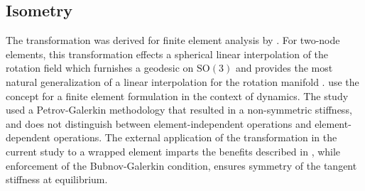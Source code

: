 
\subsection{\texorpdfstring{\Spherical}{Spherical} Isometry}\label{sec:sfin}

The \Spherical{} transformation 
was derived for finite element analysis %
by \cite{crisfield1999objectivity}.
For two-node elements, this transformation effects a 
spherical linear interpolation of the rotation field
which furnishes
 a geodesic on \(\mathrm{SO}(3)\) 
and provides the most natural generalization of 
a %
linear interpolation for the rotation manifold \citep{shoemake1985animating}.
%
\cite{jelenić1999geometrically} use the concept 
for a finite element formulation in the context of dynamics.
The study used a Petrov-Galerkin methodology that resulted
in a non-symmetric stiffness,
 and does not distinguish between element-independent operations and element-dependent operations.
The external application of the transformation in the current study to a wrapped element
imparts %
the benefits described in \cite{crisfield1999objectivity},
while enforcement of the Bubnov-Galerkin condition, %
ensures symmetry of the tangent stiffness at equilibrium.

